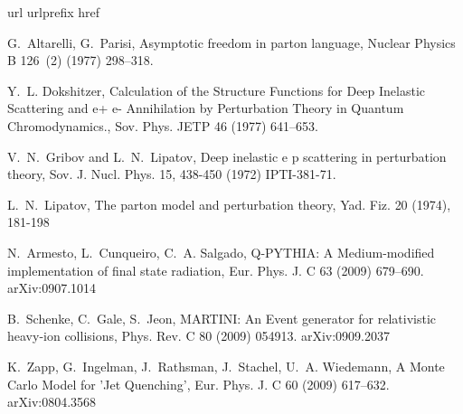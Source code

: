 \documentclass[preprint,12pt]{elsarticle}
\begin{document}

\begin{thebibliography}{99}
\expandafter\ifx\csname url\endcsname\relax
  \def\url#1{\texttt{#1}}\fi
\expandafter\ifx\csname urlprefix\endcsname\relax\def\urlprefix{URL }\fi
\expandafter\ifx\csname href\endcsname\relax
  \def\href#1#2{#2} \def\path#1{#1}\fi
  
G.~Altarelli, G.~Parisi,
{Asymptotic freedom in parton language}, Nuclear Physics B 126~(2) (1977) 298--318.

Y.~L. Dokshitzer, {Calculation of the Structure Functions for Deep Inelastic
  Scattering and e+ e- Annihilation by Perturbation Theory in Quantum
  Chromodynamics.}, Sov. Phys. JETP 46 (1977) 641--653.
  
V.~N.~Gribov and L.~N.~Lipatov,
{Deep inelastic e p scattering in perturbation theory},
Sov. J. Nucl. Phys. {15}, 438-450 (1972)
IPTI-381-71.

L.~N.~Lipatov,
{The parton model and perturbation theory},
Yad. Fiz. {20} (1974), 181-198

N.~Armesto, L.~Cunqueiro, C.~A. Salgado, {Q-PYTHIA: A Medium-modified
  implementation of final state radiation}, Eur. Phys. J. C 63 (2009) 679--690.
{\path{arXiv:0907.1014}}

B.~Schenke, C.~Gale, S.~Jeon, {MARTINI: An Event generator for relativistic
  heavy-ion collisions}, Phys. Rev. C 80 (2009) 054913.
{\path{arXiv:0909.2037}}

K.~Zapp, G.~Ingelman, J.~Rathsman, J.~Stachel, U.~A. Wiedemann, {A Monte Carlo
  Model for 'Jet Quenching'}, Eur. Phys. J. C 60 (2009) 617--632.
{\path{arXiv:0804.3568}}


\end{thebibliography}
\end{document}
